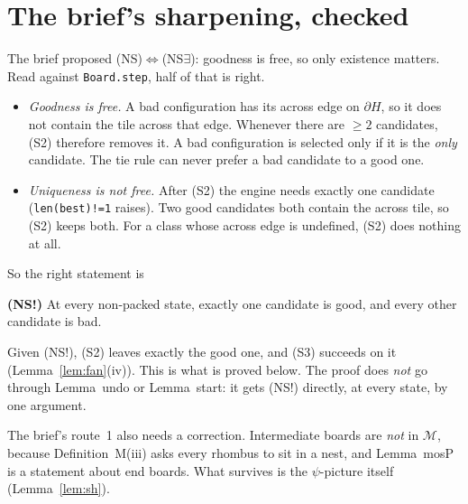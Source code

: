 \documentclass[11pt]{article}
\theoremstyle{definition}\newtheorem{definition}[theorem]{Definition}\newtheorem{remark}[theorem]{Remark}
\newcommand{\M}{\mathcal M}
\begin{document}
\section{The brief's sharpening, checked}\label{sec:sharp}
The brief proposed (NS)$\iff$(NS$\exists$): goodness is free, so only existence matters. Read against \texttt{Board.step}, half of that is right.
\begin{itemize}
\item \emph{Goodness is free.} A bad configuration has its across edge on $\partial H$, so it does not contain the tile across that edge. Whenever there are $\ge2$ candidates, (S2) therefore removes it. A bad configuration is selected only if it is the \emph{only} candidate. The tie rule can never prefer a bad candidate to a good one.
\item \emph{Uniqueness is not free.} After (S2) the engine needs exactly one candidate (\texttt{len(best)!=1} raises). Two good candidates both contain the across tile, so (S2) keeps both. For a class whose across edge is undefined, (S2) does nothing at all.
\end{itemize}
So the right statement is
\begin{center}
\textbf{(NS!)} At every non-packed state, exactly one candidate is good, and every other candidate is bad.
\end{center}
Given (NS!), (S2) leaves exactly the good one, and (S3) succeeds on it (Lemma~\ref{lem:fan}(iv)). This is what is proved below. The proof does \emph{not} go through Lemma~undo or Lemma~start: it gets (NS!) directly, at every state, by one argument.

The brief's route~1 also needs a correction. Intermediate boards are \emph{not} in $\M$, because Definition~M(iii) asks every rhombus to sit in a nest, and Lemma~mosP is a statement about end boards. What survives is the $\psi$-picture itself (Lemma~\ref{lem:sh}).
\end{document}
